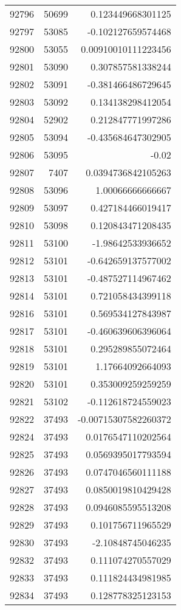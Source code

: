 \begin{tabular}{r | r | r}
92796 & 50699 & 0.123449668301125 \\
92797 & 53085 & -0.102127659574468 \\
92800 & 53055 & 0.00910010111223456 \\
92801 & 53090 & 0.307857581338244 \\
92802 & 53091 & -0.381466486729645 \\
92803 & 53092 & 0.134138298412054 \\
92804 & 52902 & 0.212847771997286 \\
92805 & 53094 & -0.435684647302905 \\
92806 & 53095 & -0.02 \\
92807 & 7407 & 0.0394736842105263 \\
92808 & 53096 & 1.00066666666667 \\
92809 & 53097 & 0.427184466019417 \\
92810 & 53098 & 0.120843471208435 \\
92811 & 53100 & -1.98642533936652 \\
92812 & 53101 & -0.642659137577002 \\
92813 & 53101 & -0.487527114967462 \\
92814 & 53101 & 0.721058434399118 \\
92816 & 53101 & 0.569534127843987 \\
92817 & 53101 & -0.460639606396064 \\
92818 & 53101 & 0.295289855072464 \\
92819 & 53101 & 1.17664092664093 \\
92820 & 53101 & 0.353009259259259 \\
92821 & 53102 & -0.112618724559023 \\
92822 & 37493 & -0.00715307582260372 \\
92824 & 37493 & 0.0176547110202564 \\
92825 & 37493 & 0.0569395017793594 \\
92826 & 37493 & 0.0747046560111188 \\
92827 & 37493 & 0.0850019810429428 \\
92828 & 37493 & 0.0946085595513208 \\
92829 & 37493 & 0.101756711965529 \\
92830 & 37493 & -2.10848745046235 \\
92832 & 37493 & 0.111074270557029 \\
92833 & 37493 & 0.111824434981985 \\
92834 & 37493 & 0.128778325123153 \\

\end{tabular}
